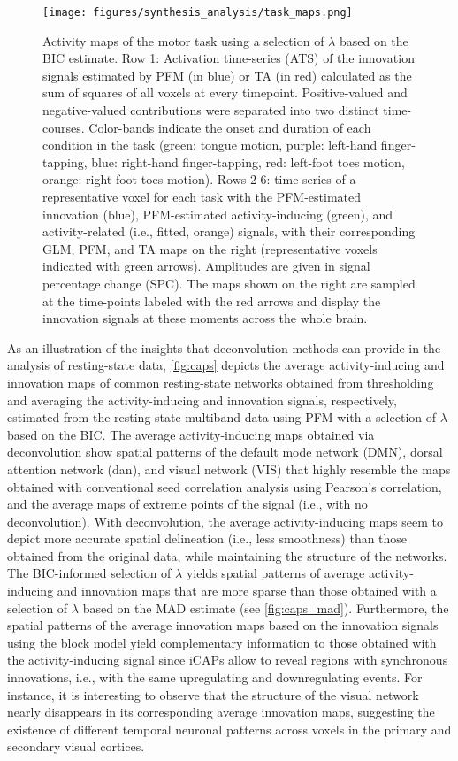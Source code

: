 \begin{figure}[t!]
    \begin{center}
        \texttt{[image: figures/synthesis\_analysis/task\_maps.png]}
    \end{center}
    \caption{Activity maps of the motor task using a selection of $\lambda$ based on the BIC estimate. Row 1: Activation time-series (ATS) of the innovation signals estimated by PFM (in blue) or TA (in red) calculated as the sum of squares of all voxels at every timepoint. Positive-valued and negative-valued contributions were separated into two distinct time-courses. Color-bands indicate the onset and duration of each condition in the task (green: tongue motion, purple: left-hand finger-tapping, blue: right-hand finger-tapping, red: left-foot toes motion, orange: right-foot toes motion). Rows 2-6: time-series of a representative voxel for each task with the PFM-estimated innovation (blue), PFM-estimated activity-inducing (green), and activity-related (i.e., fitted, orange) signals, with their corresponding GLM, PFM, and TA maps on the right (representative voxels indicated with green arrows). Amplitudes are given in signal percentage change (SPC). The maps shown on the right are sampled at the time-points labeled with the red arrows and display the innovation signals at these moments across the whole brain.}
\label{fig:task_maps}
\end{figure}

As an illustration of the insights that deconvolution methods can provide in the
analysis of resting-state data, \cref{fig:caps} depicts the average
activity-inducing and innovation maps of common resting-state networks obtained
from thresholding and averaging the activity-inducing and innovation signals,
respectively, estimated from the resting-state multiband data using PFM with a
selection of $\lambda$ based on the BIC. The average activity-inducing maps
obtained via deconvolution show spatial patterns of the default mode network
(DMN), dorsal attention network (\acrshort*{dan}), and visual network (VIS) that
highly resemble the maps obtained with conventional seed correlation analysis
using Pearson's correlation, and the average maps of extreme points of the
signal (i.e., with no deconvolution). With deconvolution, the average
activity-inducing maps seem to depict more accurate spatial delineation (i.e.,
less smoothness) than those obtained from the original data, while maintaining
the structure of the networks. The BIC-informed selection of $\lambda$ yields
spatial patterns of average activity-inducing and innovation maps that are more
sparse than those obtained with a selection of $\lambda$ based on the MAD
estimate (see \cref{fig:caps_mad}). Furthermore, the spatial patterns of the
average innovation maps based on the innovation signals using the block model
yield complementary information to those obtained with the activity-inducing
signal since iCAPs allow to reveal regions with synchronous innovations, i.e.,
with the same upregulating and downregulating events. For instance, it is
interesting to observe that the structure of the visual network nearly
disappears in its corresponding average innovation maps, suggesting the
existence of different temporal neuronal patterns across voxels in the primary
and secondary visual cortices.

